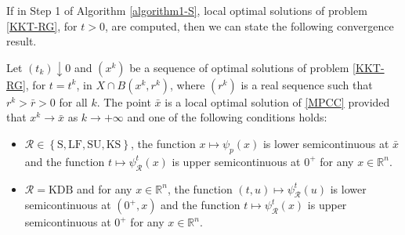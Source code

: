 If in Step 1 of Algorithm \ref{algorithm1-S}, local optimal solutions of problem \eqref{KKT-RG}, for $t>0$, are computed, then we can state the following convergence result. %
\begin{theorem}\label{sg1}
Let $(t_{k})\downarrow0$  and $(x^{k})$ be a sequence of optimal solutions of problem \eqref{KKT-RG}, for $t=t^k$, in $X\cap B(x^{k},r^{k})$, where $(r^{k})$ is a real sequence such that $r^{k}>\bar{r}>0$ for all $k$. The point $\bar{x}$ is a local optimal solution of \eqref{MPCC} provided that $x^{k} \rightarrow\bar{x}$ as $k\rightarrow+\infty$ and one of the following conditions holds:
 \begin{itemize}
     \item[$(a)$] $\mathcal{R}\in \left\{\text{S}, \text{LF}, \text{SU}, \text{KS}\right\}$, the function $x\mapsto\psi_{p}(x)$ is lower semicontinuous at  $\bar{x}$ and the function $t\mapsto\psi_{\mathcal{R}}^{t}(x)$ is upper semicontinuous at $0^+$ for any $x \in \mathbb{R}^n$.  
 \item[$(b)$]  $\mathcal{R}=\text{KDB}$ and  for any $x\in \mathbb{R}^n$, the function  $(t,u)\mapsto\psi_{\mathcal{R}}^{t}(u)$ is lower semicontinuous at  $(0^+,x)$ and the function  $t\mapsto\psi_{\mathcal{R}}^{t}(x)$ is upper semicontinuous at  $0^+$ for any $x\in \mathbb{R}^n$.
 \end{itemize}
\end{theorem}
